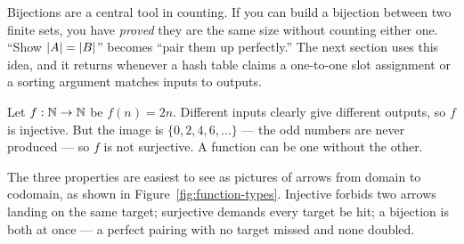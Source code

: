 \begin{focusbox}
Bijections are a central tool in counting. If you can build a bijection between
two finite sets, you have \emph{proved} they are the same size without counting
either one. ``Show $\lvert A\rvert = \lvert B\rvert$'' becomes ``pair them up perfectly.'' The
next section uses this idea, and it returns whenever a hash table claims
a one-to-one slot assignment or a sorting argument matches inputs to outputs.
\end{focusbox}

\begin{example}
\label{ch38:ex-inj}
Let $f : \mathbb{N} \to \mathbb{N}$ be $f(n) = 2n$. Different inputs clearly give different outputs,
so $f$ is injective. But the image is $\{0,2,4,6,\dots\}$ --- the odd numbers are
never produced --- so $f$ is not surjective. A function can be one without the other.
\end{example}

The three properties are easiest to see as pictures of arrows from domain to
codomain, as shown in Figure~\ref{fig:function-types}. Injective forbids two arrows landing on the same target; surjective demands
every target be hit; a bijection is both at once --- a perfect pairing with no target
missed and none doubled.

